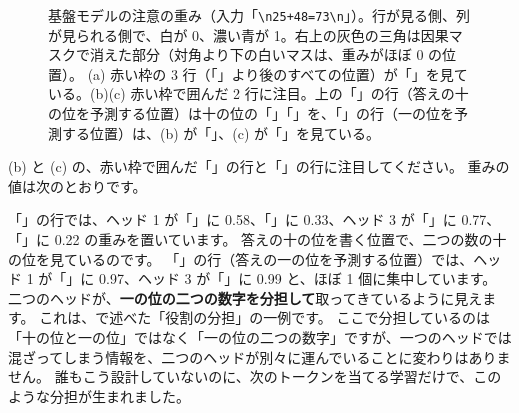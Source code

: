 \begin{figure}[tbp]
\centering
{}\hspace{1mm}%
\hspace{1mm}%
\caption{基盤モデルの注意の重み（入力「\texttt{\textbackslash n25+48=73\textbackslash n}」）。行が見る側、列が見られる側で、白が 0、濃い青が 1。右上の灰色の三角は因果マスクで消えた部分（対角より下の白いマスは、重みがほぼ 0 の位置）。
(a) 赤い枠の 3 行（「\code{=}」より後のすべての位置）が「\code{=}」を見ている。(b)(c) 赤い枠で囲んだ 2 行に注目。上の「\code{=}」の行（答えの十の位を予測する位置）は十の位の「」「」を、「」の行（一の位を予測する位置）は、(b) が「」、(c) が「」を見ている。}
\label{fig:attn-heat-drill}
\end{figure}

(b) と (c) の、赤い枠で囲んだ「\code{=}」の行と「」の行に注目してください。
重みの値は次のとおりです。


「\code{=}」の行では、ヘッド 1 が「」に 0.58、「」に 0.33、ヘッド 3 が「」に 0.77、「」に 0.22 の重みを置いています。
答えの十の位を書く位置で、二つの数の十の位を見ているのです。
「」の行（答えの一の位を予測する位置）では、ヘッド 1 が「」に 0.97、ヘッド 3 が「」に 0.99 と、ほぼ 1 個に集中しています。
二つのヘッドが、\textbf{一の位の二つの数字を分担して}取ってきているように見えます。
これは、で述べた「役割の分担」の一例です。
ここで分担しているのは「十の位と一の位」ではなく「一の位の二つの数字」ですが、一つのヘッドでは混ざってしまう情報を、二つのヘッドが別々に運んでいることに変わりはありません。
誰もこう設計していないのに、次のトークンを当てる学習だけで、このような分担が生まれました。


